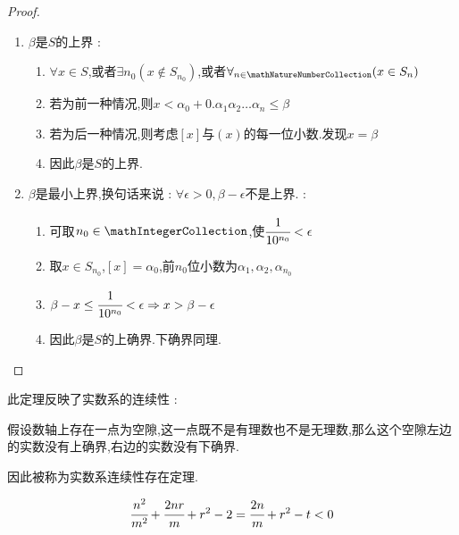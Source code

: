 {{{{\begin{enumerate}
{\begin{proof}
              \begin{enumerate}
                  \item $\beta$是$S$的上界 : \begin{enumerate}
                            \item $\forall x \in S$,或者$\exists n_0(x \notin S_{n_0})$,或者$\forall_{n \in \mathNatureNumberCollection}(x \in S_n)$
                            \item 若为前一种情况,则$x < \alpha_0 + 0.\alpha_1\alpha_2 \dots \alpha_n \leq \beta$
                            \item 若为后一种情况,则考虑$[x]$与$(x)$的每一位小数.发现$x = \beta$
                            \item 因此$\beta$是$S$的上界.
                        \end{enumerate}
                  \item $\beta$是最小上界,换句话来说 : $\forall \epsilon > 0,\beta - \epsilon$不是上界. : \begin{enumerate}
                            \item 可取$n_0 \in \mathIntegerCollection$,使$\cfrac{1}{10^{n_0}} < \epsilon$
                            \item 取$x \in S_{n_0}$,$[x] = \alpha_0$,前$n_0$位小数为$\alpha_1,\alpha_2,\alpha_{n_0}$
                            \item $\beta - x \leq \cfrac{1}{10^{n_0}} < \epsilon \Rightarrow x > \beta - \epsilon$
                            \item 因此$\beta$是$S$的上确界.下确界同理.
                        \end{enumerate}
              \end{enumerate}
          \end{proof}
          }
\end{enumerate}

此定理反映了实数系的连续性 :

假设数轴上存在一点为空隙,这一点既不是有理数也不是无理数,那么这个空隙左边的实数没有上确界,右边的实数没有下确界.

因此被称为实数系连续性存在定理.

$$
    \cfrac{n^2}{m^2} + \cfrac{2nr}{m} + r^2 - 2 = \cfrac{2n}{m} + r^2 - t < 0
$$
}%

}%

}%

}%